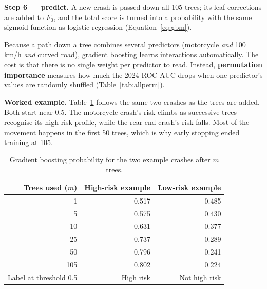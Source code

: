 \documentclass[11pt,a4paper]{article}
\begin{document}
\textbf{Step 6 --- predict.} A new crash is passed down all 105 trees; its leaf corrections are added to $F_0$, and the
total score is turned into a probability with the same sigmoid function as logistic regression
(Equation~\ref{eq:gbm}).

Because a path down a tree combines several predictors (motorcycle \emph{and} 100\,km/h \emph{and} curved road), gradient
boosting learns interactions automatically. The cost is that there is no single weight per predictor to read.
Instead, \textbf{permutation importance} measures how much the 2024 ROC-AUC drops when one predictor's values are randomly
shuffled (Table~\ref{tab:allperm}).

\textbf{Worked example.} Table~\ref{tab:example_gb} follows the same two crashes as the trees are added. Both start near
0.5. The motorcycle crash's risk climbs as successive trees recognise its high-risk profile, while the rear-end crash's
risk falls. Most of the movement happens in the first 50 trees, which is why early stopping ended training at 105.

\begin{table}[H]
\centering
\caption{Gradient boosting probability for the two example crashes after $m$ trees.}
\label{tab:example_gb}
\footnotesize
\begin{tabular}{@{}rrr@{}}
\toprule
\textbf{Trees used ($m$)} & \textbf{High-risk example} & \textbf{Low-risk example} \\
\midrule
1 & 0.517 & 0.485 \\
5 & 0.575 & 0.430 \\
10 & 0.631 & 0.377 \\
25 & 0.737 & 0.289 \\
50 & 0.796 & 0.241 \\
105 & 0.802 & 0.224 \\
\midrule
Label at threshold 0.5 & High risk & Not high risk \\
\bottomrule
\end{tabular}
\end{table}
\end{document}
